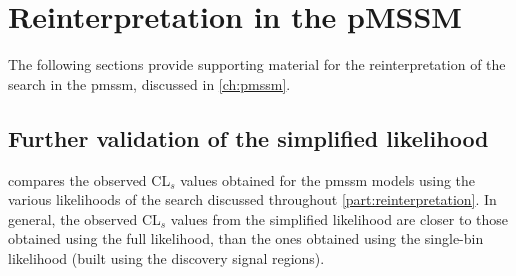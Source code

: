 
\chapter{Reinterpretation in the pMSSM}

\graphicspath{{chapter-pmssm/Figs/Vector/}{chapter-pmssm/Figs/}}

The following sections provide supporting material for the reinterpretation of the \onelepton search in the \gls{pmssm}, discussed in \cref{ch:pmssm}.


\section{Further validation of the simplified likelihood}

 compares the observed CL$_s$ values obtained for the \gls{pmssm} models using the various likelihoods of the \onelepton search discussed throughout \cref{part:reinterpretation}. In general, the observed CL$_s$ values from the simplified likelihood are closer to those obtained using the full likelihood, than the ones obtained using the single-bin likelihood (built using the discovery signal regions).

